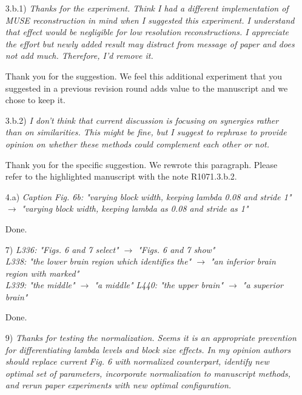 \documentclass[a4paper,11pt,twoside]{report}
\begin{document}
\begin{enumerate}
    \item [3.b.1)] \textit{Thanks for the experiment. Think I had a different implementation of MUSE reconstruction in mind when I suggested this experiment. I understand that effect would be negligible for low resolution reconstructions. I appreciate the effort but newly added result may distract from message of paper and does not add much. Therefore, I'd remove it.}

    \hspace{1em} {\color{blue} Thank you for the suggestion.
    We feel this additional experiment that you suggested
    in a previous revision round adds value to the manuscript
    and we chose to keep it.}

    \item [3.b.2)] \textit{I don't think that current discussion is focusing on synergies rather than on similarities. This might be fine, but I suggest to rephrase to provide opinion on whether these methods could complement each other or not.}

    \hspace{1em} {\color{blue} Thank you for the specific suggestion. We rewrote this paragraph. Please refer to the highlighted manuscript with the note R1071.3.b.2.}

    \item [4.a)] \textit{Caption Fig. 6b: "varying block width, keeping lambda 0.08 and stride 1" $\rightarrow$ "varying block width, keeping lambda as 0.08 and stride as 1"}

    \hspace{1em} {\color{blue} Done.}

    \item [7)] \textit{L336: "Figs. 6 and 7 select" $\rightarrow$ "Figs. 6 and 7 show"\\
    L338: "the lower brain region which identifies the" $\rightarrow$ "an inferior brain region with marked"\\
    L339: "the middle" $\rightarrow$ "a middle"
    L440: "the upper brain" $\rightarrow$ "a superior brain"}

    \hspace{1em} {\color{blue} Done.}

    \item [9)] \textit{Thanks for testing the normalization. Seems it is an appropriate prevention for differentiating lambda levels and block size effects. In my opinion authors should replace current Fig. 6 with normalized counterpart, identify new optimal set of parameters, incorporate normalization to manuscript methods, and rerun paper experiments with new optimal configuration.}


\end{enumerate}
\end{document}
